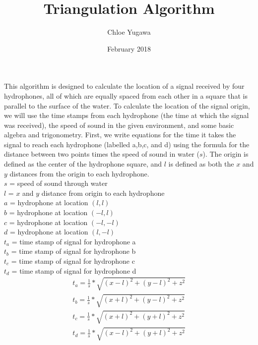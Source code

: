 \documentclass{article}
\title{Triangulation Algorithm}
\author{Chloe Yugawa}
\date{February 2018}
\begin{document}
\maketitle
\paragraph{}
This algorithm is designed to calculate the location of a signal received by four hydrophones, all of which are equally spaced from each other in a square that is parallel to the surface of the water. To calculate the location of the signal origin, we will use the time stamps from each hydrophone (the time at which the signal was received), the speed of sound in the given environment, and some basic algebra and trigonometry. First, we write equations for the time it takes the signal to reach each hydrophone (labelled a,b,c, and d) using the formula for the distance between two points times the speed of sound in water ($s$). The origin is defined as the center of the hydrophone square, and $l$ is defined as both the $x$ and $y$ distances from the origin to each hydrophone.\\
$s$ = speed of sound through water \\
$l$ = $x$ and $y$ distance from origin to each hydrophone\\
$a$ = hydrophone at location $(l,l)$\\
$b$ = hydrophone at location $(-l,l)$\\
$c$ = hydrophone at location $(-l,-l)$\\
$d$ = hydrophone at location $(l,-l)$\\
$t_a$ = time stamp of signal for hydrophone a\\
$t_b$ = time stamp of signal for hydrophone b\\
$t_c$ = time stamp of signal for hydrophone c\\
$t_d$ = time stamp of signal for hydrophone d\\
\begin{gather*}
t_a = \frac{1}{s}*\sqrt{(x-l)^2+(y-l)^2+z^2}\\
t_b = \frac{1}{s}*\sqrt{(x+l)^2+(y-l)^2+z^2}\\
t_c = \frac{1}{s}*\sqrt{(x+l)^2+(y+l)^2+z^2}\\
t_d = \frac{1}{s}*\sqrt{(x-l)^2+(y+l)^2+z^2}
\end{gather*}
\end{document}

